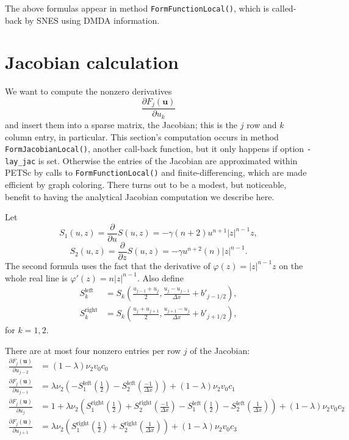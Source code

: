 \documentclass[11pt]{amsart}
\newcommand\bu{\mathbf{u}}
\begin{document}
The above formulas appear in method \verb|FormFunctionLocal()|, which is called-back by SNES using DMDA information.


\section{Jacobian calculation}

We want to compute the nonzero derivatives
   $$\frac{\partial F_j(\bu)}{\partial u_k}$$
and insert them into a sparse matrix, the Jacobian; this is the $j$ row and $k$ column entry, in particular.  This section's computation occurs in method \verb|FormJacobianLocal()|, another call-back function, but it only happens if option \verb|-lay_jac| is set.  Otherwise the entries of the Jacobian are approximated within PETSc by calls to \verb|FormFunctionLocal()| and finite-differencing, which are made efficient by graph coloring.  There turns out to be a modest, but noticeable, benefit to having the analytical Jacobian computation we describe here.

Let
	$$S_1(u,z) = \frac{\partial}{\partial u} S(u,z) = - \gamma (n+2) u^{n+1} |z|^{n-1} z,$$
	$$S_2(u,z) = \frac{\partial}{\partial z} S(u,z) = - \gamma u^{n+2} (n) |z|^{n-1}.$$
The second formula uses the fact that the derivative of $\varphi(z) = |z|^{n-1} z$ on the whole real line is $\varphi'(z) = n |z|^{n-1}$.  Also define
\begin{align*}
S_k^{\text{left}} &= S_k\left(\frac{u_{j-1}+u_j}{2},\frac{u_j-u_{j-1}}{\Delta x} + b'_{j-1/2}\right), \\
S_k^{\text{right}} &= S_k\left(\frac{u_j+u_{j+1}}{2},\frac{u_{j+1}-u_j}{\Delta x} + b'_{j+1/2}\right),
\end{align*}
for $k=1,2$.

There are at most four nonzero entries per row $j$ of the Jacobian:
\begin{align*}
\frac{\partial F_j(\bu)}{\partial u_{j-2}} &= (1-\lambda) \nu_2 v_0 c_0 \\
\frac{\partial F_j(\bu)}{\partial u_{j-1}} &= \lambda \nu_2 \left( - S_1^{\text{left}} (\tfrac{1}{2}) - S_2^{\text{left}} (\tfrac{-1}{\Delta x}) \right) + (1-\lambda) \nu_2 v_0 c_1 \\
\frac{\partial F_j(\bu)}{\partial u_j} &= 1 + \lambda \nu_2 \left( S_1^{\text{right}} (\tfrac{1}{2}) + S_2^{\text{right}} (\tfrac{-1}{\Delta x}) - S_1^{\text{left}} (\tfrac{1}{2}) - S_2^{\text{left}} (\tfrac{1}{\Delta x}) \right) + (1-\lambda) \nu_2 v_0 c_2 \\
\frac{\partial F_j(\bu)}{\partial u_{j+1}} &= \lambda \nu_2 \left( S_1^{\text{right}} (\tfrac{1}{2}) + S_2^{\text{right}} (\tfrac{1}{\Delta x}) \right) + (1-\lambda) \nu_2 v_0 c_3
\end{align*}



%
%
\end{document}

